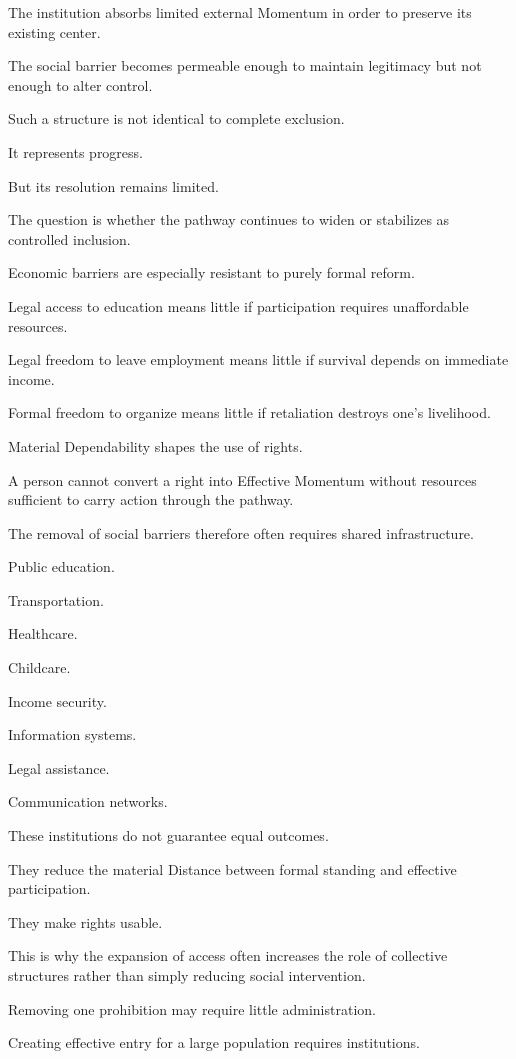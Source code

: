 The institution absorbs limited external Momentum in order to preserve its existing center.

The social barrier becomes permeable enough to maintain legitimacy but not enough to alter control.

Such a structure is not identical to complete exclusion.

It represents progress.

But its resolution remains limited.

The question is whether the pathway continues to widen or stabilizes as controlled inclusion.

Economic barriers are especially resistant to purely formal reform.

Legal access to education means little if participation requires unaffordable resources.

Legal freedom to leave employment means little if survival depends on immediate income.

Formal freedom to organize means little if retaliation destroys one’s livelihood.

Material Dependability shapes the use of rights.

A person cannot convert a right into Effective Momentum without resources sufficient to carry action through the pathway.

The removal of social barriers therefore often requires shared infrastructure.

Public education.

Transportation.

Healthcare.

Childcare.

Income security.

Information systems.

Legal assistance.

Communication networks.

These institutions do not guarantee equal outcomes.

They reduce the material Distance between formal standing and effective participation.

They make rights usable.

This is why the expansion of access often increases the role of collective structures rather than simply reducing social intervention.

Removing one prohibition may require little administration.

Creating effective entry for a large population requires institutions.

